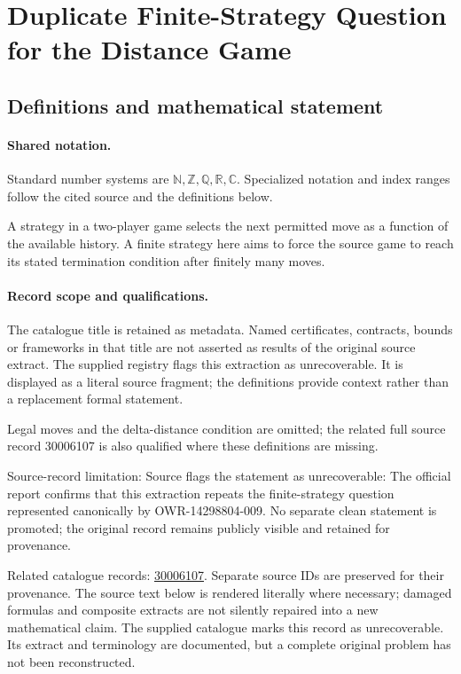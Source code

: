 \documentclass[11pt]{article}
\begin{document}
\section{Duplicate Finite-Strategy Question for the Distance Game}\label{statement}

\subsection{Definitions and mathematical statement}

\paragraph{Shared notation.}Standard number systems are $\mathbb N,\mathbb Z,\mathbb Q,\mathbb R,\mathbb C$. Specialized notation and index ranges follow the cited source and the definitions below.


A strategy in a two-player game selects the next permitted move as a function of the available history. A finite strategy here aims to force the source game to reach its stated termination condition after finitely many moves.
\paragraph{Record scope and qualifications.}
The catalogue title is retained as metadata. Named certificates, contracts, bounds or frameworks in that title are not asserted as results of the original source extract.
The supplied registry flags this extraction as unrecoverable. It is displayed as a literal source fragment; the definitions provide context rather than a replacement formal statement.

Legal moves and the delta-distance condition are omitted; the related full source record 30006107 is also qualified where these definitions are missing.

Source-record limitation: Source flags the statement as unrecoverable: The official report confirms that this extraction repeats the finite-strategy question represented canonically by OWR-14298804-009. No separate clean statement is promoted; the original record remains publicly visible and retained for provenance.

Related catalogue records: \href{https://mehmetmars7.github.io/Erdosproblems-llm-hunter/problem.html?type=open_problems&id=30006107}{30006107}. Separate source IDs are preserved for their provenance.
The source text below is rendered literally where necessary; damaged formulas and composite extracts are not silently repaired into a new mathematical claim.
The supplied catalogue marks this record as unrecoverable. Its extract and terminology are documented, but a complete original problem has not been reconstructed.
\end{document}
